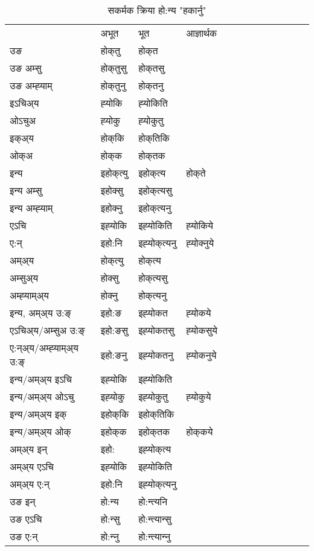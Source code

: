 \begin{table}[H]
\centering
\caption{\label{okt.vt} सकर्मक क्रिया  हो:न्य  "हकार्नु"  }
\begin{tabular}{l|l|l|l|l|l|l|l|l|l|l|l|l}  \toprule
&अभूत & भूत & आज्ञार्थक \\ 
उङ &होक्‌तु &होक्‌त \\ 
उङ अम्सु&होक्‌तुसु &होक्‌तसु \\ 
उङ अम्ह्‍याम्&होक्‌तुनु &होक्‌तनु \\ 
इऽचिअ्य &ह्‍योकि &ह्‍योकिति   \\ 
ओऽचुअ        &ह्‍योकु &ह्‍योकुतु   \\ 
इक्अ्य&होक्‌कि &होक्‌तिकि   \\ 
ओक्अ &होक्‌क &होक्‌तक   \\ 
इन्य & इहोक्‌त्यु  & इहोक्‌त्य &होक्‌ते  \\ 
इन्य अम्सु& इहोक्सु  & इहोक्‌त्यसु   \\ 
इन्य अम्ह्‍याम्& इहोक्‍नु  & इहोक्‌त्यनु   \\ 
एऽचि & इह्‍योकि & इह्‍योकिति &ह्‍योकिये    \\ 
ए:न् & इहो:नि  & इह्‍योक्‌त्यनु &ह्‍योक्‍नुये  \\ 
अम्अ्य & होक्‌त्यु  & होक्‌त्य  \\ 
अम्सुअ्य & होक्सु & होक्‌त्यसु  \\ 
अम्ह्‍याम्अ्य & होक्‍नु  & होक्‌त्यनु \\ 
\midrule
इन्य, अम्अ्य उ:ङ्‌ &इहो:ङ &इह्‍योकत &ह्‍योकये \\ 
एऽचिअ्य/अम्सुअ उ:ङ्‌ &इहो:ङसु &इह्‍योकतसु &ह्‍योकसुये \\ 
ए:न्अ्य/अम्ह्‍याम्अ्य उ:ङ्‌ &इहो:ङनु &इह्‍योकतनु &ह्‍योकनुये \\ 
इन्य/अम्अ्य इऽचि &इह्‍योकि &इह्‍योकिति    \\ 
इन्य/अम्अ्य ओऽचु &इह्‍योकु &इह्‍योकुतु  &ह्‍योकुये  \\ 
इन्य/अम्अ्य इक् &इहोक्‌कि &इहोक्‌तिकि   \\ 
इन्य/अम्अ्य ओक् &इहोक्‌क &इहोक्‌तक  &होक्‌कये  \\ 
अम्अ्य इन् & इहो: & इह्‍योक्‌त्य   \\ 
अम्अ्य एऽचि & इह्‍योकि & इह्‍योकिति    \\ 
अम्अ्य ए:न् & इहो:नि  & इह्‍योक्‌त्यनु  \\ 
\midrule
उङ इन् & हो:न्य  & हो:न्त्यनि  \\ 
उङ एऽचि & हो:न्सु  & हो:न्त्यान्सु   \\ 
उङ ए:न्& हो:न्‍नु  & हो:न्त्यान्‍नु   \\ 
\bottomrule
\end{tabular}
\end{table}


